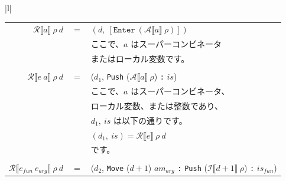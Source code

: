 \documentclass{jbook}
\begin{document}
\begin{tabular} {|l|}
\begin{tabular}{r c l}
		\\
		$\mathcal{R} \llbracket a \rrbracket ~ \rho ~ d$                 & $=$ & $(d, ~ \left[ \texttt{Enter} ~ (\mathcal{A} \llbracket a \rrbracket ~ \rho) \right])$                                                         \\
		                                                                 &     & ここで、$a$ はスーパーコンビネータ                                                                                                            \\
		                                                                 &     & またはローカル変数です。                                                                                                                      \\
		\\
		$\mathcal{R} \llbracket e ~ a \rrbracket ~ \rho ~ d$             & $=$ & ($d_1$, \texttt{Push} ($\mathcal{A} \llbracket a \rrbracket ~ \rho$) \texttt{:} $is$)                                                         \\
		                                                                 &     & ここで、$a$ はスーパーコンビネータ、                                                                                                          \\
		                                                                 &     & ローカル変数、または整数であり、                                                                                                              \\
		                                                                 &     & $d_1, ~ is$ は以下の通りです。                                                                                                                \\
		                                                                 &     & $(d_1, ~ is) = \mathcal{R} \llbracket e \rrbracket ~ \rho ~ d$                                                                                \\
		                                                                 &     & です。                                                                                                                                        \\
		\\
		$\mathcal{R} \llbracket e_{fun} ~ e_{arg} \rrbracket ~ \rho ~ d$ & $=$ & ($d_2$, \texttt{Move} ($d + 1$) $am_{arg}$ \texttt{:} \texttt{Push} ($\mathcal{I} \llbracket d + 1 \rrbracket ~ \rho$) \texttt{:} $is_{fun}$) \\

\end{tabular}
\end{tabular}
\end{document}
